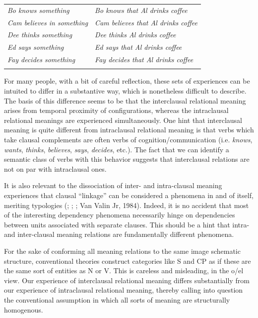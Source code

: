 \begin{tabularx}{\textwidth}{XX}
\lsptoprule
\textit{Bo knows something} & \textit{Bo knows that Al drinks coffee}\\
\textit{Cam believes in something} & \textit{Cam believes that Al drinks coffee}\\
\textit{Dee thinks something}  & \textit{Dee thinks Al drinks coffee}\\
\textit{Ed says something} & \textit{Ed says that Al drinks coffee}\\
\textit{Fay decides something} & \textit{Fay decides that Al drinks coffee}\\
\lspbottomrule
\end{tabularx}
  For many people, with a bit of careful reflection, these sets of experiences can be intuited to differ in a substantive way, which is nonetheless difficult to describe. The basis of this difference seems to be that the interclausal relational meaning arises from temporal proximity of configurations, whereas the intraclausal relational meanings are experienced simultaneously. One hint that interclausal meaning is quite different from intraclausal relational meaning is that verbs which take clausal complements are often verbs of cognition/communication (i.e. \textit{knows}, \textit{wants}, \textit{thinks}, \textit{believes}, \textit{says}, \textit{decides}, etc.). The fact that we can identify a semantic class of verbs with this behavior suggests that interclausal relations are not on par with intraclausal ones. 

  It is also relevant to the dissociation of inter- and intra-clausal meaning experiences that clausal “linkage” can be considered a phenomena in and of itself, meriting typologies (\citealt{Bickel2010}; \citealt{Bril2010}; \citealt{Lehmann1988}; Van Valin Jr, 1984). Indeed, it is no accident that most of the interesting dependency phenomena necessarily hinge on dependencies between units associated with separate clauses. This should be a hint that intra- and inter-clausal meaning relations are fundamentally different phenomena.

  For the sake of conforming all meaning relations to the same image schematic structure, conventional theories construct categories like S and CP as if these are the same sort of entities as N or V. This is careless and misleading, in the o/el view. Our experience of interclausal relational meaning differs substantially from our experience of intraclausal relational meaning, thereby calling into question the conventional assumption in which all sorts of meaning are structurally homogenous.

